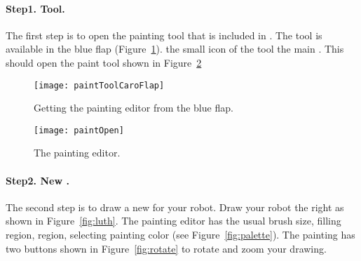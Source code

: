 \paragraph{Step1.  Tool.}
The first step  is to open the painting tool that is included in \sq. The  tool is available in the  blue flap (Figure~\ref{fig:paintToolCaroFlap}).  the small icon of the  tool  the main . This should open the paint tool shown in Figure~\ref{fig:paintOpen}

\begin{figure}
\begin{center}
\texttt{[image: paintToolCaroFlap]} 
\end{center}
\caption{ \label{fig:paintToolCaroFlap} Getting the painting editor from the blue flap.}
\end{figure}





\begin{figure}
\begin{center}
\texttt{[image: paintOpen]}
\caption{The  painting editor. \label{fig:paintOpen}}
\end{center}
\end{figure}

\paragraph{Step2.  New . }
The second step is to draw a new  for  your robot. Draw your robot  the right\add{,} as shown in Figure~\ref{fig:luth}. The painting editor has the usual  brush size, filling  region,  region,  selecting  painting color (see Figure~\ref{fig:palette}). The painting  has two buttons \add{(}shown in Figure~\ref{fig:rotate}\add{)}  to rotate and zoom your drawing. 

